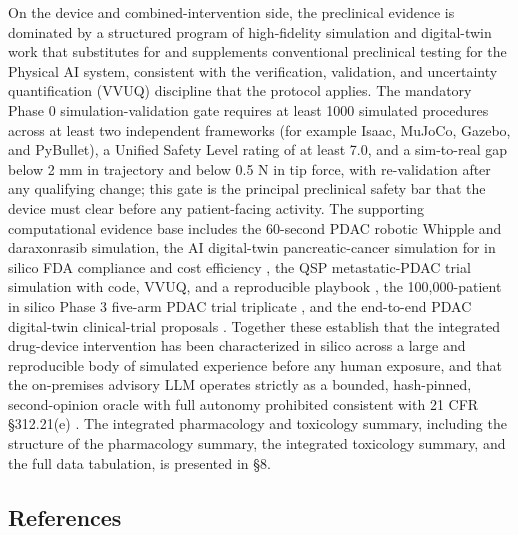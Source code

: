 On the device and combined-intervention side, the preclinical evidence is dominated
by a structured program of high-fidelity simulation and digital-twin work that
substitutes for and supplements conventional preclinical testing for the Physical AI
system, consistent with the verification, validation, and uncertainty
quantification (VVUQ) discipline that the protocol applies. The mandatory Phase 0
simulation-validation gate requires at least 1000 simulated procedures across at
least two independent frameworks (for example Isaac, MuJoCo, Gazebo, and PyBullet),
a Unified Safety Level rating of at least 7.0, and a sim-to-real gap below 2 mm in
trajectory and below 0.5 N in tip force, with re-validation after any qualifying
change; this gate is the principal preclinical safety bar that the device must clear
before any patient-facing activity. The supporting computational evidence base
includes the 60-second PDAC robotic Whipple and daraxonrasib simulation, the AI
digital-twin pancreatic-cancer simulation for in silico FDA compliance and cost
efficiency \cite{fdadigtwinpc}, the QSP metastatic-PDAC trial simulation with code,
VVUQ, and a reproducible playbook \cite{qspmetpancre}, the 100,000-patient in silico
Phase 3 five-arm PDAC trial triplicate \cite{chatgpt100kp}, and the end-to-end PDAC
digital-twin clinical-trial proposals \cite{pdacdigtwinp}. Together these establish
that the integrated drug-device intervention has been characterized in silico across
a large and reproducible body of simulated experience before any human exposure, and
that the on-premises advisory LLM operates strictly as a bounded, hash-pinned,
second-opinion oracle with full autonomy prohibited consistent with 21 CFR
\S 312.21(e) \cite{clintrustpai, congress9510}. The integrated pharmacology and
toxicology summary, including the structure of the pharmacology summary, the
integrated toxicology summary, and the full data tabulation, is presented in \S 8.

\subsection{References}

